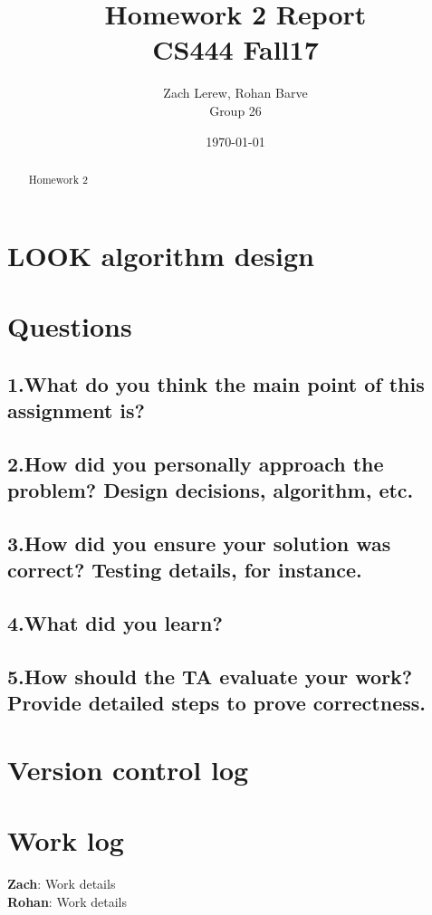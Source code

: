 \documentclass[letterpaper,10pt,fleqn]{article}
\title{Homework 2 Report\\\large CS444 Fall17}
\author{Zach Lerew, Rohan Barve\\\large Group 26}
\date{\today}
\begin{document}
	\begin{titlingpage}
		\maketitle
		\begin{abstract}
			Homework 2
		\end{abstract}
	\end{titlingpage}


	\section*{LOOK algorithm design}

	\section*{Questions}
	\subsection*{1.What do you think the main point of this assignment is?}
	\subsection*{2.How did you personally approach the problem? Design decisions, algorithm, etc.}
	\subsection*{3.How did you ensure your solution was correct? Testing details, for instance.}
	\subsection*{4.What did you learn?}
	\subsection*{5.How should the TA evaluate your work? Provide detailed steps to prove correctness.}

	\section*{Version control log}


	\section*{Work log}

	\textbf{Zach}: Work details
	\\\textbf{Rohan}: Work details
\end{document}
